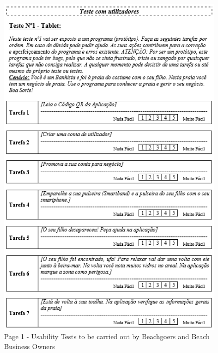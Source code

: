 \begin{figure}[H]
      \centering
      \includegraphics[width=14cm]{figs/UsabilityTest_Beachgoers_1.png}
      \caption{Page 1 - Usability Tests to be carried out by Beachgoers and Beach Business Owners}
      \label{fig:UsabilityTest_Beachgoers_1}
\end{figure}
